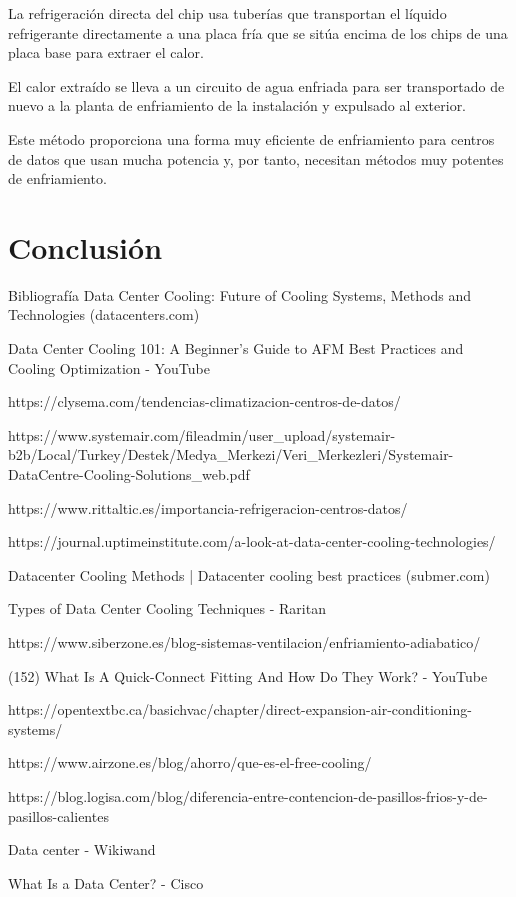 La refrigeración directa del chip usa tuberías que transportan el líquido refrigerante directamente a una placa fría que se sitúa encima de los chips de una placa base para extraer el calor.

El calor extraído se lleva a un circuito de agua enfriada para ser transportado de nuevo a la planta de enfriamiento de la instalación  y expulsado al exterior.

Este método proporciona una forma muy eficiente de enfriamiento para centros de datos que usan mucha potencia y, por tanto, necesitan métodos muy potentes de enfriamiento.

\section*{Conclusión}



Bibliografía
Data Center Cooling: Future of Cooling Systems, Methods and Technologies (datacenters.com)

Data Center Cooling 101: A Beginner's Guide to AFM Best Practices and Cooling Optimization - YouTube

https://clysema.com/tendencias-climatizacion-centros-de-datos/

https://www.systemair.com/fileadmin/user_upload/systemair-b2b/Local/Turkey/Destek/Medya_Merkezi/Veri_Merkezleri/Systemair-DataCentre-Cooling-Solutions_web.pdf

https://www.rittaltic.es/importancia-refrigeracion-centros-datos/

https://journal.uptimeinstitute.com/a-look-at-data-center-cooling-technologies/

Datacenter Cooling Methods | Datacenter cooling best practices (submer.com)

Types of Data Center Cooling Techniques - Raritan

https://www.siberzone.es/blog-sistemas-ventilacion/enfriamiento-adiabatico/

(152) What Is A Quick-Connect Fitting And How Do They Work? - YouTube

https://opentextbc.ca/basichvac/chapter/direct-expansion-air-conditioning-systems/

https://www.airzone.es/blog/ahorro/que-es-el-free-cooling/

https://blog.logisa.com/blog/diferencia-entre-contencion-de-pasillos-frios-y-de-pasillos-calientes

Data center - Wikiwand

What Is a Data Center? - Cisco


